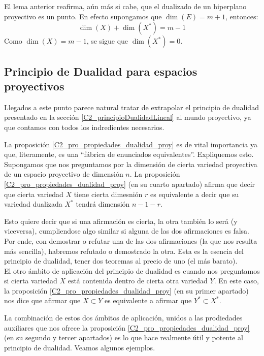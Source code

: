\begin{obs}
	El lema anterior reafirma, aún más si cabe, que el dualizado de un hiperplano proyectivo es un punto. En efecto supongamos que $\dim(E)=m+1$, entonces:
	\begin{equation*}
	\dim(X)+\dim(X^*)=m-1
	\end{equation*}
	Como $\dim(X)=m-1$, se sigue que $\dim(X^*)=0$.
\end{obs}

\subsection{Principio de Dualidad para espacios proyectivos}
\label{C2_principioDualidadProyectiva}
Llegados a este punto parece natural tratar de extrapolar el principio de dualidad presentado en la sección \ref{C2_principioDualidadLineal} al mundo proyectivo, ya que contamos con todos los indredientes necesarios.

La proposición \ref{C2_pro_propiedades_dualidad_proy} es de vital importancia ya que, literamente, es una ``fábrica de enunciados equivalentes''. Expliquemos esto.\\

Supongamos que nos preguntamos por la dimensión de cierta variedad proyectiva de un espacio proyectivo de dimensión $n$. La proposición \ref{C2_pro_propiedades_dualidad_proy} (en su cuarto apartado) afirma que decir que cierta variedad $X$ tiene cierta dimesnión $r$ es equivalente a decir que su variedad dualizada $X^*$ tendrá dimensión $n-1-r$.

Esto quiere decir que si una afirmación es cierta, la otra también lo será (y viceversa), cumpliendose algo similar si alguna de las dos afirmaciones es falsa. Por ende, con demostrar o refutar una de las dos afirmaciones (la que nos resulta más sencilla), habremos refutado o demostrado la otra. Esta es la esencia del principio de dualidad, tener dos teoremas al precio de uno (el más barato).\\

El otro ámbito de aplicación del principio de dualidad es cuando nos preguntamos si cierta variedad $X$ está contenida dentro de cierta otra variedad $Y$. En este caso, la proposición \ref{C2_pro_propiedades_dualidad_proy} (en su primer apartado) nos dice que afirmar que $X\subset Y$ es equivalente a afirmar que $Y^*\subset X^*$.

La combinación de estos dos ámbitos de aplicación, unidos a las prodiedades auxiliares que nos ofrece la proposición \ref{C2_pro_propiedades_dualidad_proy} (en su segundo y tercer apartados) es lo que hace  realmente útil y potente al principio de dualidad. Veamos algunos ejemplos.

